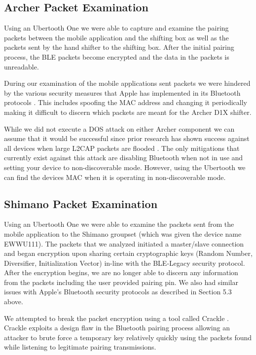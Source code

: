 \documentclass[letterpaper,twocolumn,10pt]{article}
\begin{document}
\subsection{Archer Packet Examination}

Using an Ubertooth One we were able to capture and examine the pairing packets between the mobile application and the shifting box as well as the packets sent by the hand shifter to the shifting box. After the initial pairing process, the BLE packets become encrypted and the data in the packets is unreadable.

During our examination of the mobile applications sent packets we were hindered by the various security measures that Apple has implemented in its Bluetooth protocols \cite{appleblesecurity}. This includes spoofing the MAC address and changing it periodically making it difficult to discern which packets are meant for the Archer D1X shifter. 

While we did not execute a DOS attack on either Archer component we can assume that it would be successful since prior research has shown success against all devices when large L2CAP packets are flooded \cite{bluesmack}. The only mitigations that currently exist against this attack are disabling Bluetooth when not in use and setting your device to non-discoverable mode. However, using the Ubertooth we can find the devices MAC when it is operating in non-discoverable mode. 

\subsection{Shimano Packet Examination}

Using an Ubertooth One we were able to examine the packets sent from the mobile application to the Shimano groupset (which was given the device name EWWU111). The packets that we analyzed initiated a master/slave connection and began encryption upon sharing certain cryptographic keys (Random Number, Diversifier, Initialization Vector) in-line with the BLE-Legacy security protocol. After the encryption begins, we are no longer able to discern any information from the packets including the user provided pairing pin. We also had similar issues with Apple’s Bluetooth security protocols as described in Section 5.3 above. 

We attempted to break the packet encryption using a tool called Crackle \cite{crackle}. Crackle exploits a design flaw in the Bluetooth pairing process allowing an attacker to brute force a temporary key relatively quickly using the packets found while listening to legitimate pairing transmissions.
\end{document}
